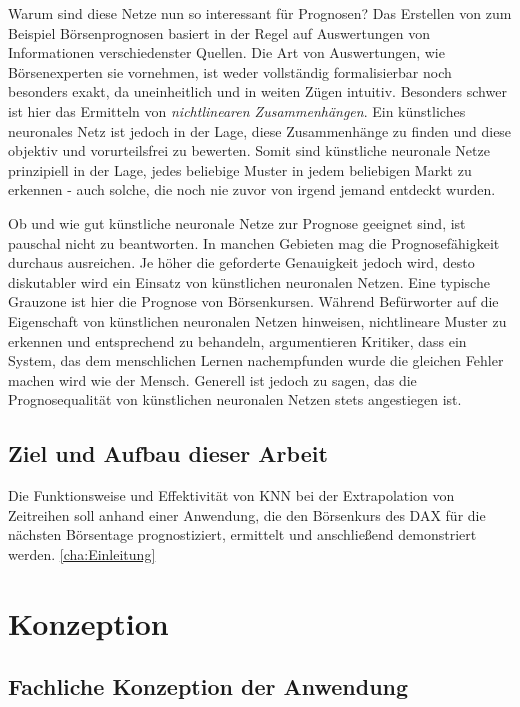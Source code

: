 \documentclass[a4paper,DIV11,bibliography=totoc,headings=normal,ngerman,headsepline,listof=totoc,parskip=half]{scrreprt}
\begin{document}
Warum sind diese Netze nun so interessant für Prognosen? Das Erstellen von zum Beispiel Börsenprognosen basiert in der Regel auf Auswertungen von Informationen verschiedenster Quellen. Die Art von Auswertungen, wie Börsenexperten sie vornehmen, ist weder vollständig formalisierbar noch besonders exakt, da uneinheitlich und in weiten Zügen intuitiv. Besonders schwer ist hier das Ermitteln von \textit{nichtlinearen Zusammenhängen}. Ein künstliches neuronales Netz ist jedoch in der Lage, diese Zusammenhänge zu finden  und diese objektiv und vorurteilsfrei zu bewerten. Somit sind künstliche neuronale Netze prinzipiell in der Lage, jedes beliebige Muster in jedem beliebigen Markt zu erkennen - auch solche, die noch nie zuvor von irgend jemand entdeckt wurden.

Ob und wie gut künstliche neuronale Netze zur Prognose geeignet sind, ist pauschal nicht zu beantworten. In manchen Gebieten mag die Prognosefähigkeit durchaus ausreichen. Je höher die geforderte Genauigkeit jedoch wird, desto diskutabler wird ein Einsatz von künstlichen neuronalen Netzen. Eine typische Grauzone ist hier die Prognose von Börsenkursen. Während Befürworter auf die Eigenschaft von künstlichen neuronalen Netzen hinweisen, nichtlineare Muster zu erkennen und entsprechend zu behandeln, argumentieren Kritiker, dass ein System, das dem menschlichen Lernen nachempfunden wurde die gleichen Fehler machen wird wie der Mensch. Generell ist jedoch zu sagen, das die Prognosequalität von künstlichen neuronalen Netzen stets angestiegen ist.


\section{Ziel und Aufbau dieser Arbeit}
\label{sec:Ziel}
Die Funktionsweise und Effektivität von KNN bei der Extrapolation von Zeitreihen soll anhand einer Anwendung, die den Börsenkurs des DAX für die nächsten Börsentage prognostiziert, ermittelt und anschließend demonstriert werden.
\ref{cha:Einleitung}
 
\chapter{Konzeption} %
\label{cha:Konzeption}
\section{Fachliche Konzeption der Anwendung} %
\label{sec:Konzeption Anwendung}
\end{document}
